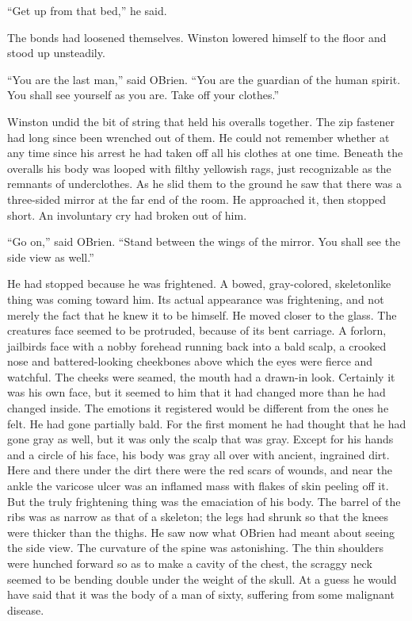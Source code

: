 ``Get up from that bed,'' he said.

The bonds had loosened themselves. Winston lowered himself to the floor
and stood up unsteadily.

``You are the last man,'' said O\textquotesingle Brien. ``You are the
guardian of the human spirit. You shall see yourself as you are. Take
off your clothes.''

Winston undid the bit of string that held his overalls together. The zip
fastener had long since been wrenched out of them. He could not remember
whether at any time since his arrest he had taken off all his clothes at
one time. Beneath the overalls his body was looped with filthy yellowish
rags, just recognizable as the remnants of underclothes. As he slid them
to the ground he saw that there was a three-sided mirror at the far end
of the room. He approached it, then stopped short. An involuntary cry
had broken out of him.

``Go on,'' said O\textquotesingle Brien. ``Stand between the wings of the
mirror. You shall see the side view as well.''

He had stopped because he was frightened. A bowed, gray-colored,
skeletonlike thing was coming toward him. Its actual appearance was
frightening, and not merely the fact that he knew it to be himself. He
moved closer to the glass. The creature\textquotesingle s face seemed to
be protruded, because of its bent carriage. A forlorn,
jailbird\textquotesingle s face with a nobby forehead running back into
a bald scalp, a crooked nose and battered-looking cheekbones above which
the eyes were fierce and watchful. The cheeks were seamed, the mouth had
a drawn-in look. Certainly it was his own face, but it seemed to him
that it had changed more than he had changed inside. The emotions it
registered would be different from the ones he felt. He had gone
partially bald. For the first moment he had thought that he had gone
gray as well, but it was only the scalp that was gray. Except for his
hands and a circle of his face, his body was gray all over with ancient,
ingrained dirt. Here and there under the dirt there were the red scars
of wounds, and near the ankle the varicose ulcer was an inflamed mass
with flakes of skin peeling off it. But the truly frightening thing was
the emaciation of his body. The barrel of the ribs was as narrow as that
of a skeleton; the legs had shrunk so that the knees were thicker than
the thighs. He saw now what O\textquotesingle Brien had meant about
seeing the side view. The curvature of the spine was astonishing. The
thin shoulders were hunched forward so as to make a cavity of the chest,
the scraggy neck seemed to be bending double under the weight of the
skull. At a guess he would have said that it was the body of a man of
sixty, suffering from some malignant disease.

